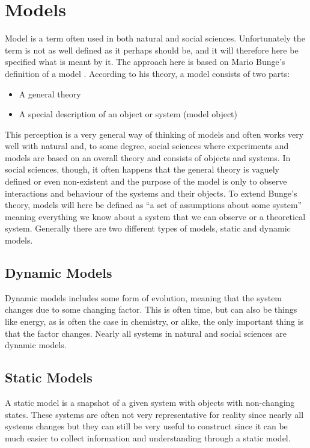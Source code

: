 \section{Models}
\label{sec:models}
Model is a term often used in both natural and social sciences. Unfortunately the term is not as well defined as it perhaps should be, and it will therefore here be specified what is meant by it. The approach here is based on Mario Bunge's definition of a model \cite{world_as_a_process}. According to his theory, a model consists of two parts:

\begin{itemize}
\item A general theory
\item A special description of an object or system (model object)
\end{itemize}

This perception is a very general way of thinking of models and often works very well with natural and, to some degree, social sciences where experiments and models are based on an overall theory and consists of objects and systems. In social sciences, though, it often happens that the general theory is vaguely defined or even non-existent and the purpose of the model is only to observe interactions and behaviour of the systems and their objects.
To extend Bunge's theory, models will here be defined as \enquote{a set of assumptions about some system} meaning everything we know about a system that we can observe or a theoretical system.
Generally there are two different types of models, static and dynamic models.


\subsection{Dynamic Models}
Dynamic models includes some form of evolution, meaning that the system changes due to some changing factor. This is often time, but can also be things like energy, as is often the case in chemistry, or alike, the only important thing is that the factor changes. Nearly all systems in natural and social sciences are dynamic models.


\subsection{Static Models}
A static model is a snapshot of a given system with objects with non-changing states. These systems are often not very representative for reality since nearly all systems changes but they can still be very useful to construct since it can be much easier to collect information and understanding through a static model.


